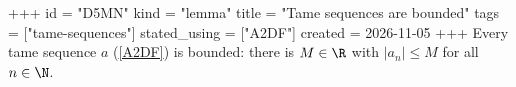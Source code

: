 +++
id = "D5MN"
kind = "lemma"
title = "Tame sequences are bounded"
tags = ["tame-sequences"]
stated_using = ["A2DF"]
created = 2026-11-05
+++
Every tame sequence $a$ (\ref{A2DF}) is bounded: there is $M \in \R$ with $|a_n| \le M$ for all $n \in \N$.
